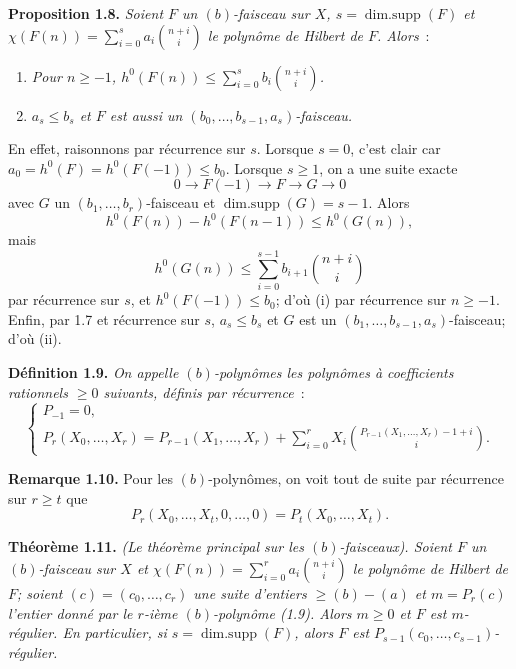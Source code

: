 \textbf{Proposition 1.8.} \emph{Soient \(F\) un \((b)\)-faisceau sur \(X\), \(s=\operatorname{dim{.}supp}(F)\) et \(\chi(F(n))=\sum_{i=0}^{s}a_i\binom{n+i}{i}\) le polynôme de Hilbert de \(F\). Alors}~:
\begin{enumerate}[label=(\roman*)]
\item \emph{Pour \(n\ge -1\), \(h^0(F(n))\le \sum_{i=0}^{s}b_i\binom{n+i}{i}\).}
\item \emph{\(a_s\le b_s\) et \(F\) est aussi un \((b_0,\ldots,b_{s-1},a_s)\)-faisceau.}
\end{enumerate}
En effet, raisonnons par récurrence sur \(s\). Lorsque \(s=0\), c'est clair car \(a_0=h^0(F)=h^0(F(-1))\le b_0\). Lorsque \(s\ge1\), on a une suite exacte
\[
0\longrightarrow F(-1)\longrightarrow F\longrightarrow G\longrightarrow0
\]
avec \(G\) un \((b_1,\ldots,b_r)\)-faisceau et \(\operatorname{dim{.}supp}(G)=s-1\). Alors
\[
h^0(F(n))-h^0(F(n-1))\le h^0(G(n)),
\]
mais
\[
h^0(G(n))\le\sum_{i=0}^{s-1}b_{i+1}\binom{n+i}{i}
\]
par récurrence sur \(s\), et \(h^0(F(-1))\le b_0\); d'où (i) par récurrence sur \(n\ge -1\). Enfin, par 1.7 et récurrence sur \(s\), \(a_s\le b_s\) et \(G\) est un \((b_1,\ldots,b_{s-1},a_s)\)-faisceau; d'où (ii).

\textbf{Définition 1.9.} \emph{On appelle \emph{\((b)\)-polynômes} les polynômes à coefficients rationnels \(\ge0\) suivants, définis par récurrence}~:
\[
\begin{cases}
P_{-1}=0,\\
P_r(X_0,\ldots,X_r)=P_{r-1}(X_1,\ldots,X_r)
+\displaystyle\sum_{i=0}^{r}X_i
\binom{P_{r-1}(X_1,\ldots,X_r)-1+i}{i}.
\end{cases}
\]

\textbf{Remarque 1.10.} Pour les \((b)\)-polynômes, on voit tout de suite par récurrence sur \(r\ge t\) que
\[
P_r(X_0,\ldots,X_t,0,\ldots,0)=P_t(X_0,\ldots,X_t).
\]

\textbf{Théorème 1.11.} \emph{(Le théorème principal sur les \((b)\)-faisceaux). Soient \(F\) un \((b)\)-faisceau sur \(X\) et \(\chi(F(n))=\sum_{i=0}^{r}a_i\binom{n+i}{i}\) le polynôme de Hilbert de \(F\); soient \((c)=(c_0,\ldots,c_r)\) une suite d'entiers \(\ge (b)-(a)\) et \(m=P_r(c)\) l'entier donné par le \(r\)-ième \((b)\)-polynôme (1.9). Alors \(m\ge0\) et \(F\) est \(m\)-régulier. En particulier, si \(s=\operatorname{dim{.}supp}(F)\), alors \(F\) est \(P_{s-1}(c_0,\ldots,c_{s-1})\)-régulier.}

